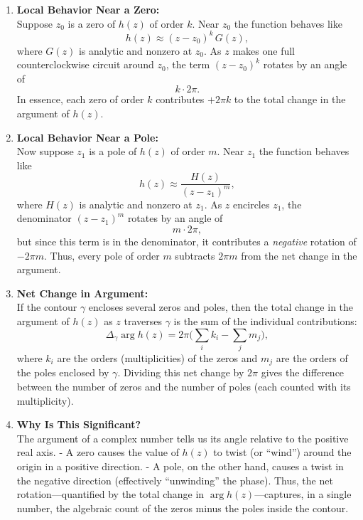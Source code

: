 \documentclass[12pt]{article}
\theoremstyle{definition} %
\theoremstyle{plain} %
\begin{document}
\begin{enumerate}
    \item \textbf{Local Behavior Near a Zero:}\\[0.5em]
          Suppose \(z_0\) is a zero of \(h(z)\) of order \(k\). Near \(z_0\) the function behaves like
          \[
              h(z) \approx (z - z_0)^k \, G(z),
          \]
          where \(G(z)\) is analytic and nonzero at \(z_0\).  
          As \(z\) makes one full counterclockwise circuit around \(z_0\), the term \((z - z_0)^k\) rotates by an angle of 
          \[
              k\cdot 2\pi.
          \]
          In essence, each zero of order \(k\) contributes \(+2\pi k\) to the total change in the argument of \( h(z) \).

    \item \textbf{Local Behavior Near a Pole:}\\[0.5em]
          Now suppose \(z_1\) is a pole of \(h(z)\) of order \(m\). Near \(z_1\) the function behaves like
          \[
              h(z) \approx \frac{H(z)}{(z - z_1)^m},
          \]
          where \(H(z)\) is analytic and nonzero at \(z_1\).  
          As \(z\) encircles \(z_1\), the denominator \((z - z_1)^m\) rotates by an angle of 
          \[
              m\cdot 2\pi,
          \]
          but since this term is in the denominator, it contributes a \emph{negative} rotation of \(-2\pi m\). Thus, every pole of order \(m\) subtracts \(2\pi m\) from the net change in the argument.

    \item \textbf{Net Change in Argument:}\\[0.5em]
          If the contour \(\gamma\) encloses several zeros and poles, then the total change in the argument of \( h(z) \) as \( z \) traverses \(\gamma\) is the sum of the individual contributions:
          \[
              \Delta_\gamma \arg h(z) = 2\pi\Biggl( \sum_{i} k_i - \sum_{j} m_j \Biggr),
          \]
          where \( k_i \) are the orders (multiplicities) of the zeros and \( m_j \) are the orders of the poles enclosed by \(\gamma\).  
          Dividing this net change by \(2\pi\) gives the difference between the number of zeros and the number of poles (each counted with its multiplicity).

    \item \textbf{Why Is This Significant?}\\[0.5em]
          The argument of a complex number tells us its angle relative to the positive real axis.  
          - A zero causes the value of \( h(z) \) to twist (or “wind”) around the origin in a positive direction.  
          - A pole, on the other hand, causes a twist in the negative direction (effectively “unwinding” the phase).  
          Thus, the net rotation—quantified by the total change in \(\arg h(z)\)—captures, in a single number, the algebraic count of the zeros minus the poles inside the contour.


\end{enumerate}
\end{document}
